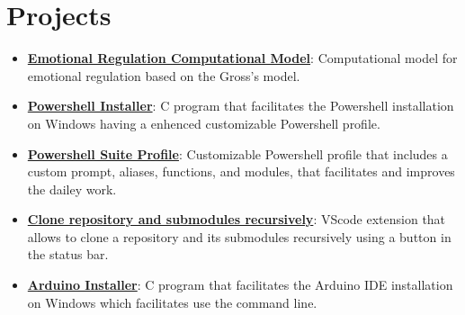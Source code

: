 \documentclass[letterpaper,11pt]{article}
\newcommand{\resumeItem}[2]{
  \item\small{
    \textbf{#1}{: #2 \vspace{-2pt}}
  }
}
\newcommand{\resumeSubItem}[2]{\resumeItem{#1}{#2}\vspace{-4pt}}
\newcommand{\resumeSubHeadingListStart}{\begin{itemize}[leftmargin=*]}
\newcommand{\resumeSubHeadingListEnd}{\end{itemize}}
\begin{document}
\section{Projects}
  \resumeSubHeadingListStart
    \resumeSubItem{\href{https://github.com/JuanJoseSolorzano/Emotional_Regulation_And_FAtiMA_Model/tree/master/Assets/EmotionalRegulation}{Emotional Regulation Computational Model}}
      {Computational model for emotional regulation based on the Gross's model.}
    \resumeSubItem{\href{https://github.com/JuanJoseSolorzano/Powershell_Installer}{Powershell Installer}}
      {C program that facilitates the Powershell installation on Windows having a enhenced customizable Powershell profile.}
    \resumeSubItem{\href{https://github.com/JuanJoseSolorzano/Powershell_Suite}{Powershell Suite Profile}}
      {Customizable Powershell profile that includes a custom prompt, aliases, functions, and modules, that facilitates and improves the dailey work.}
    \resumeSubItem{\href{https://github.com/JuanJoseSolorzano/Clone_Repo_Recursive}{Clone repository and submodules recursively}}
      {VScode extension that allows to clone a repository and its submodules recursively using a button in the status bar.}
    \resumeSubItem{\href{https://github.com/JuanJoseSolorzano/Arduino_Installer}{Arduino Installer}}
      {C program that facilitates the Arduino IDE installation on Windows which facilitates use the command line.}
  \resumeSubHeadingListEnd
\end{document}
